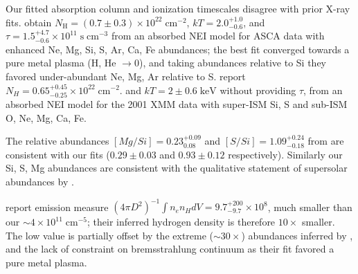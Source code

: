 \documentclass[preprint2,tighten,trackchanges]{aastex6}
\newcommand*{\mt}{\mathrm}
\newcommand*{\unit}[1]{\;\mt{#1}}  %
\newcommand*{\abt}{\mathord{\sim}} %
\newcommand*{\nH}{N_{\mathrm{H}}}
\newcommand*{\nHUnits}{\times 10^{22} \unit{cm^{-2}}}
\newcommand*{\kB}{k}  %
\begin{document}


Our fitted absorption column and ionization timescales disagree with prior
X-ray fits.
\citet{rakowski2001} obtain $\nH = (0.7 \pm 0.3) \nHUnits$,
$\kB T = 2.0^{+1.0}_{-0.6}$, and
$\tau = 1.5^{+4.7}_{-0.6} \times 10^{11} \unit{s\;cm^{-3}}$
from an absorbed NEI model for ASCA data with enhanced Ne, Mg, Si, S, Ar, Ca,
Fe abundances; the best fit converged towards a pure metal plasma
(H, He $\to 0$), and taking abundances relative to Si they favored
under-abundant Ne, Mg, Ar relative to S.
\citet{safi-harb2007} report $N_H = 0.65^{+0.45}_{-0.25} \nHUnits$.
and $\kB T = 2 \pm 0.6 \unit{keV}$ without providing $\tau$, from
an absorbed NEI model for the 2001 XMM data with
super-ISM Si, S and sub-ISM O, Ne, Mg, Ca, Fe.

The relative abundances $[Mg/Si] = 0.23^{+0.09}_{0.08}$ and $[S/Si] =
1.09^{+0.24}_{-0.18}$ from \citet{rakowski2001} are consistent with our fits
($0.29 \pm 0.03$ and $0.93 \pm 0.12$ respectively).  Similarly our Si, S, Mg
abundances are consistent with the qualitative statement of supersolar
abundances by \citet{safi-harb2007}.

\citet{rakowski2001} report emission measure
$(4\pi D^2)^{-1} \int n_e n_H dV = 9.7^{+200}_{-9.7} \times 10^8$, much smaller
than our $\abt 4 \times 10^{11} \unit{cm^{-5}}$; their inferred hydrogen
density is therefore $10\times$ smaller.
The low value is partially offset by the extreme ($\abt 30\times$) abundances
inferred by \citet{rakowski2001}, and the lack of constraint on bremsstrahlung
continuum as their fit favored a pure metal plasma.
\end{document}
